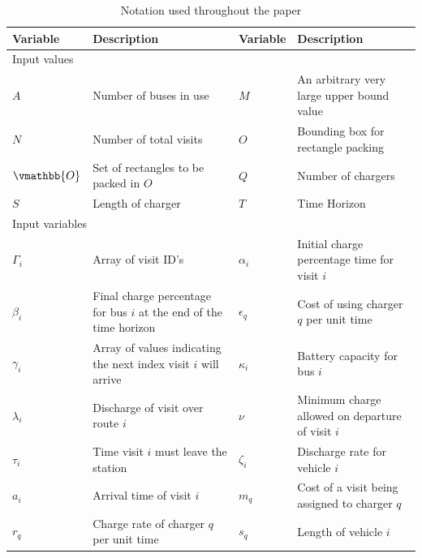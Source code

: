 \documentclass[letterpaper, 10pt, conference]{IEEEtran}
\begin{document}
\begin{table}[!t]
	\caption{Notation used throughout the paper}
	\label{tab:variables}
	\centering
	\begin{tabular}{l l l l}
		\toprule
		\textbf{Variable} & \textbf{Description} & \textbf{Variable} & \textbf{Description} \\
		\toprule
		\multicolumn{4}{l}{Input values} \\
			$A$           & Number of buses in use                       &
			$M$           & An arbitrary very large upper bound value \\
			$N$           & Number of total visits                    &
			$O$           & Bounding box for rectangle packing        \\
			$\vmathbb{O}$ & Set of rectangles to be packed in \(O\)   &
			$Q$           & Number of chargers                        \\
			$S$           & Length of charger                         &
			$T$           & Time Horizon                              \\
		\hline
		\multicolumn{4}{l}{Input variables} \\
			$\Gamma_i$   & Array of visit ID's                                                &
			$\alpha_i$   & Initial charge percentage time for visit  $i$                      \\
			$\beta_{i}$  & Final charge percentage for bus $i$ at the end of the time horizon &
			$\epsilon_q$ & Cost of using charger $q$ per unit time                            \\
			$\gamma_i$   & Array of values indicating the next index visit $i$ will arrive    &
			$\kappa_i$   & Battery capacity for bus \(i\)                                     \\
			$\lambda_i$  & Discharge of visit over route  $i$                                 &
			$\nu$        & Minimum charge allowed on departure of visit \(i\)                 \\
			$\tau_i$     & Time visit $i$ must leave the station                              &
			$\zeta_i$    & Discharge rate for vehicle \(i\)                                   \\
			$a_i$        & Arrival time of visit  $i$                                         &
			$m_q$        & Cost of a visit being assigned to charger  $q$                     \\
			$r_q$        & Charge rate of charger $q$ per unit time                           &
			$s_q$        & Length of vehicle \(i\)                                            \\

\end{tabular}
\end{table}
\end{document}
